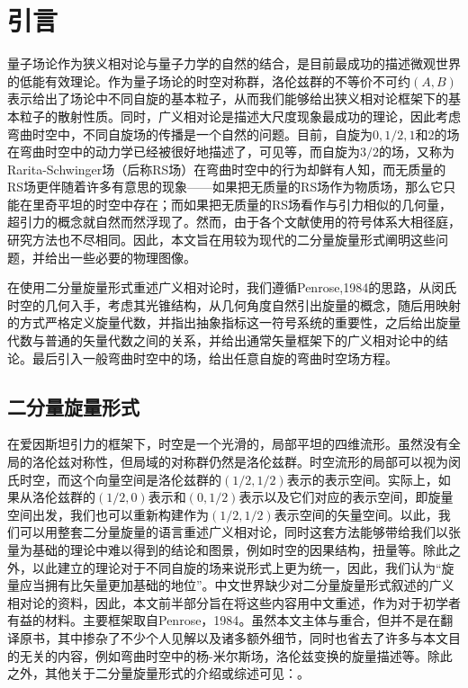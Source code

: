 \chapter{引言}

量子场论作为狭义相对论与量子力学的自然的结合，是目前最成功的描述微观世界的低能有效理论\parencite{weinberg1995quantum}。作为量子场论的时空对称群，洛伦兹群的不等价不可约$( A,B)$表示给出了场论中不同自旋的基本粒子，从而我们能够给出狭义相对论框架下的基本粒子的散射性质。同时，广义相对论是描述大尺度现象最成功的理论，因此考虑弯曲时空中，不同自旋场的传播是一个自然的问题。目前，自旋为$0,1/2,1$和$2$的场在弯曲时空中的动力学已经被很好地描述了，可见\parencite{chandrasekhar1998mathematical}等，而自旋为$3/2$的场，又称为Rarita-Schwinger场\parencite{rarita1941theory}（后称RS场）在弯曲时空中的行为却鲜有人知，而无质量的RS场更伴随着许多有意思的现象——如果把无质量的RS场作为物质场，那么它只能在里奇平坦的时空中存在\parencite{frauendiener_spin32_1995}；而如果把无质量的RS场看作与引力相似的几何量，超引力的概念就自然而然浮现了\parencite{deser_consistent_1976,freedman_progress_1976}。然而，由于各个文献使用的符号体系大相径庭，研究方法也不尽相同。因此，本文旨在用较为现代的二分量旋量形式阐明这些问题，并给出一些必要的物理图像。

在使用二分量旋量形式重述广义相对论时，我们遵循Penrose,1984\parencite{penrose_spinors_1984}的思路，从闵氏时空的几何入手，考虑其光锥结构，从几何角度自然引出旋量的概念，随后用映射的方式严格定义旋量代数，并指出抽象指标这一符号系统的重要性，之后给出旋量代数与普通的矢量代数之间的关系，并给出通常矢量框架下的广义相对论中的结论。最后引入一般弯曲时空中的场，给出任意自旋的弯曲时空场方程。


\section{二分量旋量形式}

在爱因斯坦引力的框架下，时空是一个光滑的，局部平坦的四维流形\parencite{penrose_spinors_1984}。虽然没有全局的洛伦兹对称性，但局域的对称群仍然是洛伦兹群。时空流形的局部可以视为闵氏时空，而这个向量空间是洛伦兹群的$( 1/2,1/2)$表示的表示空间。实际上，如果从洛伦兹群的$( 1/2,0)$表示和$( 0,1/2)$表示以及它们对应的表示空间，即旋量空间出发，我们也可以重新构建作为$( 1/2,1/2)$表示空间的矢量空间。以此，我们可以用整套二分量旋量的语言重述广义相对论，同时这套方法能够带给我们以张量为基础的理论中难以得到的结论和图景，例如时空的因果结构\parencite{geroch1968spinor}，扭量\parencite{penrose_spinors_1986,zichichi_twistors_1991}等。除此之外，以此建立的理论对于不同自旋的场来说形式上更为统一，因此，我们认为“旋量应当拥有比矢量更加基础的地位”。中文世界缺少对二分量旋量形式叙述的广义相对论的资料，因此，本文前半部分旨在将这些内容用中文重述，作为对于初学者有益的材料。主要框架取自Penrose，1984\parencite{penrose_spinors_1984}。虽然本文主体与\parencite{penrose_spinors_1984}重合，但并不是在翻译原书，其中掺杂了不少个人见解以及诸多额外细节，同时也省去了许多与本文目的无关的内容，例如弯曲时空中的杨-米尔斯场，洛伦兹变换的旋量描述等。除此之外，其他关于二分量旋量形式的介绍或综述可见：\parencite{o2003introduction,alessio2018asymptotic}。

